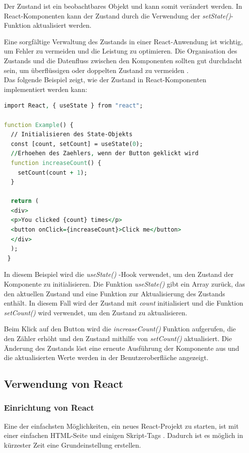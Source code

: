 Der Zustand ist ein beobachtbares Objekt und kann somit verändert werden. In React-Komponenten kann der Zustand durch die Verwendung der \emph{setState()}-Funktion aktualisiert werden.

Eine sorgfältige Verwaltung des Zustands in einer React-Anwendung ist wichtig, um Fehler zu vermeiden und die Leistung zu optimieren. Die Organisation des Zustands und die Datenfluss zwischen den Komponenten sollten gut durchdacht sein, um überflüssigen oder doppelten Zustand zu vermeiden \cite{ReactManagingState}.\\
Das folgende Beispiel zeigt, wie der Zustand in React-Komponenten implementiert werden kann:

\begin{lstlisting}[language=vhdl,
	frame=single,           % Ein Rahmen um den Code
	framexleftmargin=15pt,  % Rahmen link von den Zahlen
	style=algoBericht,
	label={State-Fkt.},
	captionpos=b ,          % Caption unter den Code setzen
	caption={Beispiel State in Reeact}]
import React, { useState } from "react";
	
function Example() {
  // Initialisieren des State-Objekts
  const [count, setCount] = useState(0);
  //Erhoehen des Zaehlers, wenn der Button geklickt wird
  function increaseCount() {
    setCount(count + 1);
  }
	
  return (
  <div>
  <p>You clicked {count} times</p>
  <button onClick={increaseCount}>Click me</button>
  </div>
  );
 }
\end{lstlisting}

In diesem Beispiel wird die \emph{useState()} -Hook verwendet, um den Zustand der Komponente zu initialisieren. Die Funktion \emph{useState()} gibt ein Array zurück, das den aktuellen Zustand und eine Funktion zur Aktualisierung des Zustands enthält. In diesem Fall wird der Zustand mit \emph{count} initialisiert und die Funktion \emph{setCount()} wird verwendet, um den Zustand zu aktualisieren.

Beim Klick auf den Button wird die \emph{increaseCount()} Funktion aufgerufen, die den Zähler erhöht und den Zustand mithilfe von \emph{setCount()} aktualisiert. Die Änderung des Zustands löst eine erneute Ausführung der Komponente aus und die aktualisierten Werte werden in der Benutzeroberfläche angezeigt.


\subsection{Verwendung von React}
\subsubsection{Einrichtung von React}
 Eine der einfachsten Möglichkeiten, ein neues React-Projekt zu starten, ist mit einer einfachen HTML-Seite und einigen Skript-Tags \cite{deLegacyReactjs}. Dadurch ist es möglich in kürzester Zeit eine Grundeinstellung erstellen.
 
